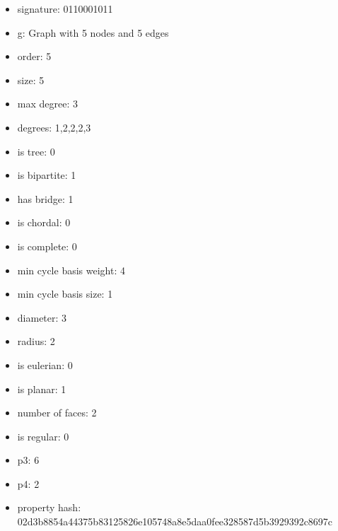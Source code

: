 \begin{itemize}
\item signature: 0110001011
\item g: Graph with 5 nodes and 5 edges
\item order: 5
\item size: 5
\item max degree: 3
\item degrees: 1,2,2,2,3
\item is tree: 0
\item is bipartite: 1
\item has bridge: 1
\item is chordal: 0
\item is complete: 0
\item min cycle basis weight: 4
\item min cycle basis size: 1
\item diameter: 3
\item radius: 2
\item is eulerian: 0
\item is planar: 1
\item number of faces: 2
\item is regular: 0
\item p3: 6
\item p4: 2
\item property hash: 02d3b8854a44375b83125826e105748a8e5daa0fee328587d5b3929392c8697c
\end{itemize}
\newpage

